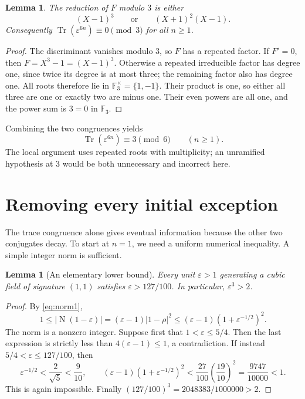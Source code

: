 \documentclass[11pt,a4paper]{article}
\newtheorem{lemma}[theorem]{Lemma}
\theoremstyle{definition}\newtheorem{definition}[theorem]{Definition}
\theoremstyle{remark}\newtheorem{remark}[theorem]{Remark}
\DeclareMathOperator{\Tr}{Tr}\DeclareMathOperator{\Norm}{N}\DeclareMathOperator{\trdeg}{trdeg}\DeclareMathOperator{\ord}{ord}\DeclareMathOperator{\lcm}{lcm}
\begin{document}
\begin{lemma}\label{lem:mod3}
The reduction of $F$ modulo $3$ is either
\[
 (X-1)^3\qquad\text{or}\qquad (X+1)^2(X-1).
\]
Consequently $\Tr(\varepsilon^{6n})\equiv0\pmod3$ for all $n\ge1$.
\end{lemma}
\begin{proof}
The discriminant vanishes modulo $3$, so $F$ has a repeated factor. If $F'=0$, then $F=X^3-1=(X-1)^3$. Otherwise a repeated irreducible factor has degree one, since twice its degree is at most three; the remaining factor also has degree one. All roots therefore lie in $\mathbb F_3^\times=\{1,-1\}$. Their product is one, so either all three are one or exactly two are minus one. Their even powers are all one, and the power sum is $3=0$ in $\mathbb F_3$.
\end{proof}

Combining the two congruences yields
\begin{equation}\label{eq:trace6}
 \Tr(\varepsilon^{6n})\equiv3\pmod6\qquad(n\ge1).
\end{equation}
The local argument uses repeated roots with multiplicity; an unramified hypothesis at $3$ would be both unnecessary and incorrect here.

\section{Removing every initial exception}
The trace congruence alone gives eventual information because the other two conjugates decay. To start at $n=1$, we need a uniform numerical inequality. A simple integer norm is sufficient.

\begin{lemma}[An elementary lower bound]\label{lem:small}
Every unit $\varepsilon>1$ generating a cubic field of signature $(1,1)$ satisfies $\varepsilon>127/100$. In particular, $\varepsilon^3>2$.
\end{lemma}
\begin{proof}
By \eqref{eq:norm1},
\[
 1\le |\Norm(1-\varepsilon)|
 =(\varepsilon-1)|1-\rho|^2
 \le(\varepsilon-1)(1+\varepsilon^{-1/2})^2.
\]
The norm is a nonzero integer. Suppose first that $1<\varepsilon\le5/4$. Then the last expression is strictly less than $4(\varepsilon-1)\le1$, a contradiction. If instead $5/4<\varepsilon\le127/100$, then
\[
 \varepsilon^{-1/2}<\frac2{\sqrt5}<\frac9{10},
 \qquad
 (\varepsilon-1)(1+\varepsilon^{-1/2})^2
 <\frac{27}{100}\left(\frac{19}{10}\right)^2
 =\frac{9747}{10000}<1.
\]
This is again impossible. Finally $(127/100)^3=2048383/1000000>2$.
\end{proof}
\end{document}
